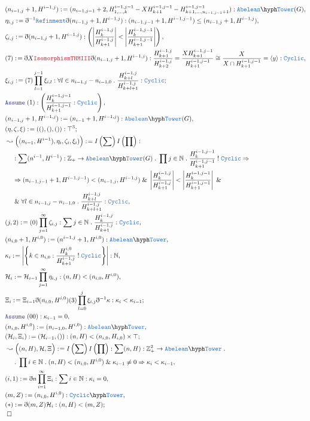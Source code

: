 \documentclass[12pt]{scrartcl}
\newcommand{\TYPE}[1]{\textcolor{NavyBlue}{\mathtt{#1}}}
\newcommand{\LOGIC}[1]{\textcolor{Blue}{\mathtt{#1}}}
\newcommand{\THM}[1]{\textcolor{Maroon}{\mathtt{#1}}}
\renewcommand{\.}{\; . \;}
\newcommand{\de}{: \kern 0.1pc =}
\newcommand{\IsNot}{\; ! \;}
\newcommand{\NewLine}{\\ & \kern 1pc}
\newcommand{\Page}[1]{ \begin{align*} #1 \end{align*}   }
\newcommand{ \bd }{ \ByDef }
\renewcommand{\And}{\; \& \;}
\newcommand{\Int}{\mathbb{Z} }
\newcommand{\Nat}{\mathbb{N} }
\newcommand{\Say}[3]{& #1 \de #2 : #3, \\}
\newcommand{\Conclude}[3]{& #1 \de #2 : #3; \\}
\newcommand{\Derive}[3]{& \leadsto #1 \de #2 : #3, \\}
\newcommand{\Assume}[2]{& \LOGIC{Assume} \; #1 : #2, \\}
\newcommand{\QED}{\; \square}
\newcommand{\EndProof}{& \QED \\}
\newcommand{\ByDef}{\eth}
\newcommand{\Abel}{\TYPE{Abelean}}
\begin{document}
{}\Page{
	\Say{(n_{i-1,j} + 1,H^{i-1,j})}{(n_{i-1,j-1}+2,H^{i-1,j-1}_{1,\ldots,k}-XH^{i-1,j-1}_{k+1}
		-H^{i-1,j-1}_{k+1,\ldots,n_{i-1,j-1} + 1}    )}{\Abel\hyph\TYPE{Tower}(G)}
	\Say{\eta_{i,j}}{\bd^{-1}\TYPE{Refinment}\bd (n_{i-1,j}+1,H^{i-1,j})}
	{ (n_{i-1,j-1} +1,H^{i-1,j-1} ) \le (n_{i-1,j} +1,H^{i-1,j})       }
	\Say{\zeta_{i,j}}{  \bd (n_{i-1,j}+1,H^{i-1,j})}
	{\left( \left|  \frac{H^{i-1,j}_{k}}{H^{i-1,j}_{k+1}} \right| <  
		\left|\frac{H^{i-1,j-1}_{k}}{H^{i-1,j-1}_{k+1}}\right|\right)}
	\Say{(7)}{\bd X \THM{IsomorphismTHMIII} \bd (n_{i-1,j}+1,H^{i-1,j} )}
	{ 	
	  \frac{H^{i-1,j}_{k+1}}{H^{i-1,j}_{k+2}} = \frac{XH^{i-1,j-1}_{k+1}}{H^{i-1,j-1}_{k+1}} \cong
	   \frac{X}{X \cap H^{i-1,j-1}_{k+1}} = \langle y \rangle : \TYPE{Cyclic}
	}
	\Conclude{\xi_{i,j}}{ (7)\prod^{j-1}_{l=1} \xi_{i,l}} 
	{   \forall l \in n_{i-1,j} -n_{i-1,0} \.  
		       \frac{H^{i-1,j}_{k + l }}{H^{i-1,j}_{k+l + 1}} :  \TYPE{Cyclic}
		}
	\Assume{(1)}{\left( \frac{H^{i-1,j-1}_{k}}{H^{i-1,j-1}_{k+1}} : \TYPE{Cyclic} \right)}
	\Say{(n_{i-1,j}+1,H^{i-1,j})}{(n_{i-1}+1,H^{i-1,j})}{\Abel\hyph\TYPE{Tower}(G)}
	\Conclude{  (\eta,\zeta,\xi)}{((),(),())}{\top^3}
	\Derive{\Big((n_{i-1},H^{i-1}),\eta_i,\zeta_i,\xi_i)\Big)}
	{
		I\left(\sum\right)I\left(\prod\right)                       
	}
	{
		\NewLine :
		\sum   (n^{i-1},H^{i-1}) : \Int_+ \to \Abel\hyph\TYPE{Tower}(G) \. \prod j \in \Nat \.
		\frac{H^{i-1,j-1}_{k}}{H^{i-1,j-1}_{k+1}}  \IsNot \TYPE{Cyclic} 
		\Rightarrow \NewLine \Rightarrow 
		( n_{i-1,j-1}+1,H^{i-1,j-1}) < ( n_{i-1,j}, H^{i-1,j}) 
		\And
		\left|  \frac{H^{i-1,j}_{k}}{H^{i-1,j}_{k+1}} \right| <  
		\left|\frac{H^{i-1,j-1}_{k}}{H^{i-1,j-1}_{k+1}}\right|
		\And \NewLine \And
		\forall l \in n_{i-1,j} -n_{i-1,0} \.  
		\frac{H^{i-1,j}_{k + l }}{H^{i-1,j}_{k+l + 1}} : \TYPE{Cyclic}	 
	}
	\Say{(j,2)}{ (0) \prod_{j =1}^\infty \zeta_{i,j} }{ \sum j \in \Nat \.     
		\frac{H^{i-1,j}_{k}}{H^{i-1,j}_{k + 1}} : \TYPE{Cyclic}	} 
	\Say{(n_{i,0} + 1,H^{i,0}) }{ (n^{i-1,j} + 1, H^{i,0})  }{\Abel\hyph\TYPE{Tower}}
	\Say{\kappa_{i}}{\left|\left\{ k \in  n_{i,0} : \frac{H^{i,0}_{k}}{H^{i-1,j}_{k+1}} \IsNot \TYPE{Cyclic}\right\} 
		\right|
	}{\Nat}
	\Say{\mathcal{H}_i}{\mathcal{H}_{i-1}\prod^\infty_{j=1} \eta_{i,j} }{ (n,H) < (n_{i,0},H^{i,0})  }
	\Conclude{\Xi_i}{\Xi_{i-1}\bd (n_{i,0},H^{i,0})(3)\prod^j_{l=0} \xi_{i,j} \bd^{-1} \kappa}
	{  \kappa_i < \kappa_{i-1} }
	\Assume{(00)}{\kappa_{i-1} = 0}
	\Say{(n_{i,0},H^{i,0})}{(n_{i-1,0},H^{i,0})}{\Abel\hyph\TYPE{Tower}}
	\Conclude{(\mathcal{H}_i,\Xi_i)}{(\mathcal{H}_{i-1},())}{ (n,H) < (n_{i,0},H_{i,0}) \times \top}
	\Derive{\Big((n,H),  \mathcal{H}, \Xi \Big)}{I\left(\sum\right)I\left(\prod\right)}
	{
		\sum (n,H) : \Int_+^2 \to \Abel\hyph\TYPE{Tower} \. \NewLine \.
		\prod i \in \Nat \.  (n,H) < (n_{i,0},H^{i,0}) \And \kappa_{i-1} \neq 0 \Rightarrow
		\kappa_i < \kappa_{i-1} 
	}
	\Say{(i,1)}{\bd n \prod^\infty_{i=1} \Xi_i}{ \sum i \in \Nat : \kappa_i = 0  }
	\Say{(m,Z)}{(n_{i,0},H^{i,0})}{\TYPE{Cyclic}\hyph\TYPE{Tower}}
	\Conclude{(*)}{\bd(m,Z)\mathcal{H}_i}{(n,H) < (m,Z)}
	\EndProof
}
\end{document}
